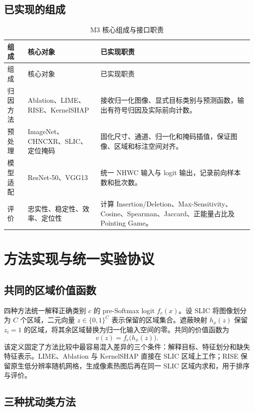 \section{已实现的组成}

{\small
    \begin{xltabular}{\textwidth}{>{\raggedright\arraybackslash}p{3.0cm}>{\raggedright\arraybackslash}p{3.2cm}X}
        \caption{M3 核心组成与接口职责}\label{tab:software-components} \\
        \toprule
        组成 & 核心对象 & 已实现职责 \\
        \midrule
        \endfirsthead
        \toprule
        组成 & 核心对象 & 已实现职责 \\
        \midrule
        \endhead
        归因方法 & Ablation、LIME、RISE、KernelSHAP & 接收归一化图像、显式目标类别与预测函数，输出有符号归因及实际前向计数。 \\
        预处理 & ImageNet、CHNCXR、SLIC、定位掩码 & 固化尺寸、通道、归一化和掩码插值，保证图像、区域和标注空间对齐。 \\
        模型适配 & ResNet-50、VGG13 & 统一 NHWC 输入与 logit 输出，记录前向样本数和批次数。 \\
        评价 & 忠实性、稳定性、效率、定位性 & 计算 Insertion/Deletion、Max-Sensitivity、Cosine、Spearman、Jaccard、正能量占比及 Pointing Game。 \\
        \bottomrule
    \end{xltabular}
}


\chapter{方法实现与统一实验协议}

\section{共同的区域价值函数}

四种方法统一解释正确类别 $c$ 的 pre-Softmax logit $f_c(x)$。设 SLIC\cite{achanta2012slic} 将图像划分为 $C$ 个区域，二元向量 $z\in\{0,1\}^C$ 表示保留的区域集合。遮蔽映射 $h_x(z)$ 保留 $z_i=1$ 的区域，将其余区域替换为归一化输入空间的零。共同的价值函数为
\[
    v(z)=f_c\bigl(h_x(z)\bigr).
\]
该定义固定了方法比较中最容易混入差异的三个条件：解释目标、特征划分和缺失特征表示。LIME、Ablation 与 KernelSHAP 直接在 SLIC 区域上工作；RISE 保留原生低分辨率随机网格，生成像素热图后再在同一 SLIC 区域内求和，用于排序与评价。

\section{三种扰动类方法}

